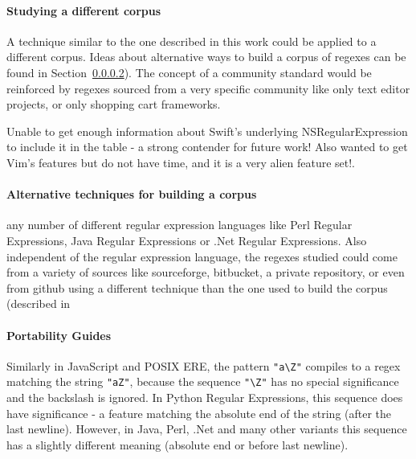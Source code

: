 \paragraph{Studying a different corpus}
A technique similar to the one described in this work could be applied to a different corpus.  Ideas about alternative ways to build a corpus of regexes can be found in Section~\ref{sec:alternateCorpus}).  The concept of a community standard would be reinforced by regexes sourced from a very specific community like only text editor projects, or only shopping cart frameworks.





Unable to get enough information about Swift's underlying NSRegularExpression to include it in the table - a strong contender for future work!  Also wanted to get Vim's features but do not have time, and it is a very alien feature set!.


\paragraph{Alternative techniques for building a corpus}
\label{sec:alternateCorpus}
any number of different regular expression languages like Perl Regular Expressions, Java Regular Expressions or .Net Regular Expressions.  Also independent of the regular expression language, the regexes studied could come from a variety of sources like sourceforge, bitbucket, a private repository, or even from github using a different technique than the one used to build the corpus (described in

\paragraph{Portability Guides}
Similarly in JavaScript and POSIX ERE, the pattern \verb!"a\Z"! compiles to a regex matching the string \verb!"aZ"!, because the sequence \verb!"\Z"! has no special significance and the backslash is ignored.  In Python Regular Expressions, this sequence does have significance - a feature matching the absolute end of the string (after the last newline).  However, in Java, Perl, .Net and many other variants this sequence has a slightly different meaning (absolute end or before last newline).
